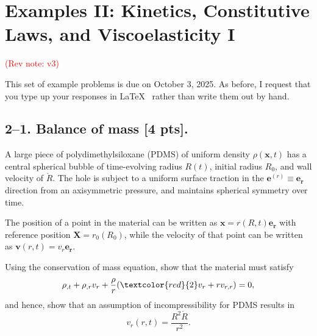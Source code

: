 \setcounter{section}{1} %


\section*{Examples II: Kinetics, Constitutive Laws, and Viscoelasticity I}
\label{PS2}
\textcolor{red}{(Rev note: v3)}


This set of example problems is due on October 3, 2025. 
As before, I request that you type up your responses in \LaTeX~ rather than write them out by hand. 

\medskip
\subsection*{2--1. \textbf{Balance of mass} [4 pts].} 
A large piece of polydimethylsiloxane (PDMS) of uniform density $\rho(\bm{x},t)$ has a central spherical bubble of time-evolving radius $R(t)$, initial radius $R_0$, and wall velocity of $\dot{R}$. 
The hole is subject to a uniform surface traction in the $\bm{e}^{(r)} \equiv \bm{e}_{\bm{r}}$ direction from an axisymmetric pressure, and maintains spherical symmetry over time. 

\medskip
The position of a point in the material can be written as $\bm{x} = r(R,t) \bm{e}_{\bm{r}}$ with reference position $\bm{X} = r_0(R_0)$, while the velocity of that point can be written as $\bm{v}(r,t) = v_r \bm{e}_{\bm{r}}$.

\medskip
Using the conservation of mass equation, show that the material must satisfy
\begin{equation*}
\rho_{,t}+ \rho_{,r} v_r + \frac{\rho}{r} (\textcolor{red}{2}v_r + r v_{r,r}) = 0,
\end{equation*}
and hence, show that an assumption of incompressibility for PDMS results in 
\begin{equation*}
v_r(r,t) = \frac{R^2 \dot{R}}{r^2}.
\end{equation*}

